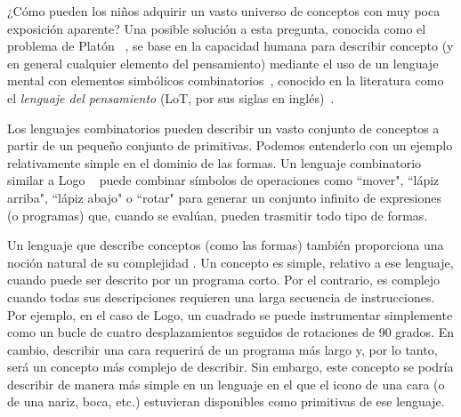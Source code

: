 ¿Cómo pueden los niños adquirir un vasto universo de conceptos con muy poca exposición aparente? Una posible solución a esta pregunta, conocida como el problema de Platón ~\cite{chomsky1986knowledge,chomsky2006cognitive}, se base en la capacidad humana para describir concepto (y en general cualquier elemento del pensamiento) mediante el uso de un lenguaje mental con elementos simbólicos combinatorios~\cite{newell1980physical}, conocido en la literatura como el {\em lenguaje del pensamiento} (LoT, por sus siglas en inglés)~\cite{fodor1975language}.


Los lenguajes combinatorios pueden describir un vasto conjunto de conceptos a partir de un pequeño conjunto de primitivas. Podemos entenderlo con un ejemplo relativamente simple en el dominio de las formas. Un lenguaje combinatorio similar a Logo ~\cite{abelson1974logo} puede combinar símbolos de operaciones como ``mover", ``lápiz arriba", ``lápiz abajo" o ``rotar" para generar un conjunto infinito de expresiones (o programas) que, cuando se evalúan, pueden trasmitir todo tipo de formas.


Un lenguaje que describe conceptos (como las formas) también proporciona una noción natural de su complejidad \cite{kolmogorov1968three}. Un concepto es simple, relativo a ese lenguaje, cuando puede ser descrito por un programa corto. Por el contrario, es complejo cuando todas sus descripciones requieren una larga secuencia de instrucciones. Por ejemplo, en el caso de Logo, un cuadrado se puede instrumentar simplemente como un bucle de cuatro desplazamientos seguidos de rotaciones de 90 grados. En cambio, describir una cara requerirá de un programa más largo y, por lo tanto, será un concepto más complejo de describir. Sin embargo, este concepto se podría describir de manera más simple en un lenguaje en el que el icono de una cara (o de una nariz, boca, etc.) estuvieran disponibles como primitivas de ese lenguaje. 

